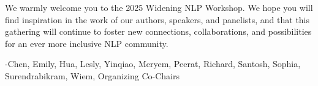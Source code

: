 \vspace{\baselineskip}

We warmly welcome you to the 2025 Widening NLP Workshop. We hope you will find inspiration in the work of our authors, speakers, and panelists, and that this gathering will continue to foster new connections, collaborations, and possibilities for an ever more inclusive NLP community.

\vspace{\baselineskip}

-Chen, Emily, Hua, Lesly, Yinqiao, Meryem, Peerat, Richard, Santosh, Sophia, Surendrabikram, Wiem, Organizing Co-Chairs